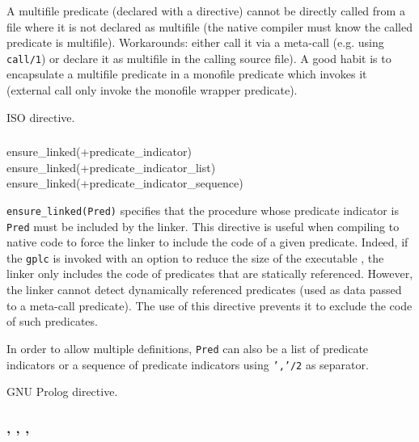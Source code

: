 A multifile predicate (declared with a  directive) cannot
be directly called from a file where it is not declared as multifile (the
native compiler must know the called predicate is multifile). Workarounds:
either call it via a meta-call (e.g. using \texttt{call/1}) or declare it as
multifile in the calling source file). A good habit is to encapsulate a
multifile predicate in a monofile predicate which invokes it (external call
only invoke the monofile wrapper predicate).

\Portability

ISO directive. 

\subsubsection{}

\begin{TemplatesOneCol}
ensure\_linked(+predicate\_indicator)\\
ensure\_linked(+predicate\_indicator\_list)\\
ensure\_linked(+predicate\_indicator\_sequence)

\end{TemplatesOneCol}

\Description

\texttt{ensure\_linked(Pred)} specifies that the procedure
whose predicate indicator is \texttt{Pred} must be included by the linker.
This directive is useful when compiling to native code to force the linker to
include the code of a given predicate. Indeed, if the \texttt{gplc} is
invoked with an option to reduce the size of the executable
, the linker only includes the code of predicates
that are statically referenced. However, the linker cannot detect dynamically
referenced predicates (used as data passed to a meta-call predicate). The use
of this directive prevents it to exclude the code of such predicates.

In order to allow multiple definitions, \texttt{Pred} can also be a list of
predicate indicators or a sequence of predicate indicators using
\texttt{','/2} as separator.

\Portability

GNU Prolog directive.

\subsubsection{,
               ,
               ,
               }

